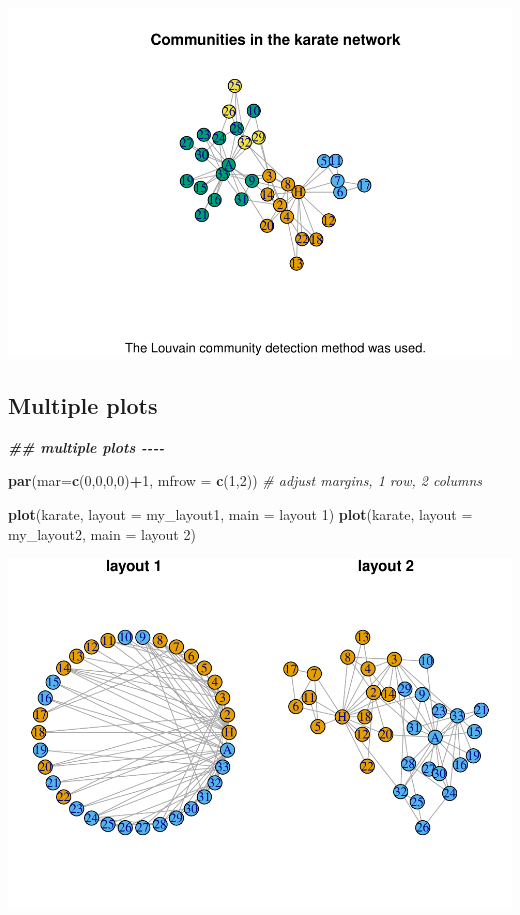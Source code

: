 \documentclass[
]{book}
\newenvironment{Shaded}{\begin{snugshade}}{\end{snugshade}}
\newcommand{\AttributeTok}[1]{\textcolor[rgb]{0.13,0.29,0.53}{#1}}
\newcommand{\CommentTok}[1]{\textcolor[rgb]{0.56,0.35,0.01}{\textit{#1}}}
\newcommand{\DecValTok}[1]{\textcolor[rgb]{0.00,0.00,0.81}{#1}}
\newcommand{\DocumentationTok}[1]{\textcolor[rgb]{0.56,0.35,0.01}{\textbf{\textit{#1}}}}
\newcommand{\FunctionTok}[1]{\textcolor[rgb]{0.13,0.29,0.53}{\textbf{#1}}}
\newcommand{\NormalTok}[1]{#1}
\newcommand{\SpecialCharTok}[1]{\textcolor[rgb]{0.81,0.36,0.00}{\textbf{#1}}}
\newcommand{\StringTok}[1]{\textcolor[rgb]{0.31,0.60,0.02}{#1}}
\begin{document}
\includegraphics{bookdown-demo_files/figure-latex/unnamed-chunk-189-1.pdf}

\subsection{Multiple plots}\label{multiple-plots}

\begin{Shaded}
\begin{Highlighting}[]
\DocumentationTok{\#\# multiple plots {-}{-}{-}{-}}

\FunctionTok{par}\NormalTok{(}\AttributeTok{mar=}\FunctionTok{c}\NormalTok{(}\DecValTok{0}\NormalTok{,}\DecValTok{0}\NormalTok{,}\DecValTok{0}\NormalTok{,}\DecValTok{0}\NormalTok{)}\SpecialCharTok{+}\DecValTok{1}\NormalTok{, }\AttributeTok{mfrow =} \FunctionTok{c}\NormalTok{(}\DecValTok{1}\NormalTok{,}\DecValTok{2}\NormalTok{)) }\CommentTok{\# adjust margins, 1 row, 2 columns  }

\FunctionTok{plot}\NormalTok{(karate, }\AttributeTok{layout =}\NormalTok{ my\_layout1, }\AttributeTok{main =} \StringTok{\textquotesingle{}layout 1\textquotesingle{}}\NormalTok{)}
\FunctionTok{plot}\NormalTok{(karate, }\AttributeTok{layout =}\NormalTok{ my\_layout2, }\AttributeTok{main =} \StringTok{\textquotesingle{}layout 2\textquotesingle{}}\NormalTok{)}
\end{Highlighting}
\end{Shaded}

\includegraphics{bookdown-demo_files/figure-latex/unnamed-chunk-190-1.pdf}
\end{document}
